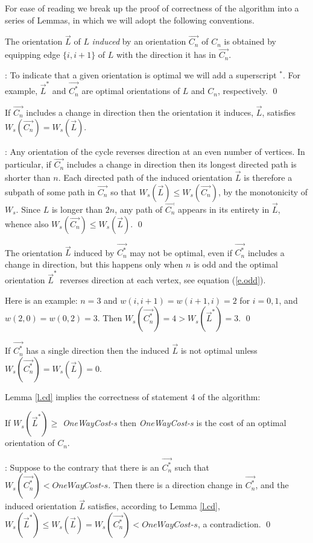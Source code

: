 For ease of reading we break up the proof of correctness of the algorithm into a series of Lemmas, in which
we will adopt the following conventions.
\begin{definition}
The orientation $\vec{L}$ of $L$ \emph{induced} by an orientation $\vec{C_n}$ 
of $C_n$ is obtained by equipping edge $\{i,i+1\}$ of $L$ with the direction it 
has in $\vec{C_n}$.
\end{definition}

: To indicate that a given orientation is optimal 
we will add a superscript $^*$.
For example, $\vec{L}^*$ and $\vec{C_n^*}$ are optimal orientations of $L$ and $C_n$,
respectively.
\qed

\begin{lemma}\label{l.cd}
	If $\vec{C_n}$ includes a change in direction then the orientation it induces,  $\vec{L}$, satisfies $W_s(\vec{C_n})= W_s(\vec{L})$.
\end{lemma}
:
Any orientation of the cycle reverses direction at an even number of vertices. In particular, if $\vec{C_n}$  includes a change in direction then its longest directed path is
shorter than $n$. Each directed path of the induced orientation $\vec{L}$ is therefore a subpath 
of some path in $\vec{C_n}$ so that $W_s(\vec{L}) \leq W_s(\vec{C_n})$, 
by the monotonicity of $W_s$. 
Since $L$ is longer than $2n$, any path of $\vec{C_n}$ appears in its entirety in $\vec{L}$,
whence also $W_s(\vec{C_n})\leq W_s(\vec{L})$. 
\qed

\begin{remark} The orientation $\vec{L}$ induced 
	by $\vec{C_n^*}$ may not be optimal, even if $\vec{C_n^*}$ includes a change in direction,
	but this happens only when $n$ is odd and the optimal orientation $\vec{L}^*$ reverses 
	direction at each vertex, see equation (\ref{e.odd}). 
\end{remark}
Here is an example: $n=3$ and $w(i,i+1)=w(i+1,i)=2$ for $i=0,1$,
and  $w(2,0)=w(0,2)=3$. Then  $W_s(\vec{C_n^*})=4> W_s(\vec{L}^*)=3$.
\qed
\begin{remark} 
	If $\vec{C_n^*}$ 
	has a single direction then the induced $\vec{L}$ is not optimal unless 
	$W_s(\vec{C_n^*})=W_s(\vec{L})=0$. 
\end{remark}

Lemma \ref{l.cd} implies the correctness of statement 4 of the algorithm:
\begin{lemma}
	If $W_s(\vec{L}^*) \geq$ \textit{OneWayCost-s} then \textit{OneWayCost-s} is the cost 
	of an optimal orientation of $C_n$. 
\end{lemma}
: Suppose to the contrary that there is an $\vec{C_n^*}$ such that 
$W_s(\vec{C_n^*})<\textit{OneWayCost-s}$. Then there is a direction change in 
$\vec{C_n^*}$, and the induced orientation $\vec{L}$ satisfies, according to Lemma \ref{l.cd},
$W_s(\vec{L}^*) \leq W_s(\vec{L}) =W_s(\vec{C_n^*}) <\textit{OneWayCost-s}$,
a contradiction.
\qed

